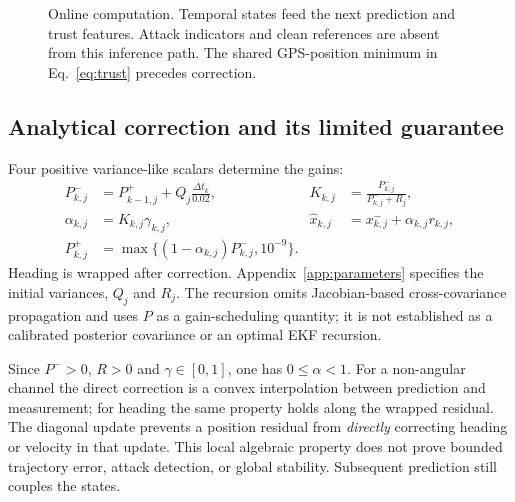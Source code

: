 ﻿\documentclass[10pt,a4paper]{article}
\begin{document}
\begin{figure}[htbp]
\centering
{}
\caption{Online computation. Temporal states feed the next prediction and trust features.
Attack indicators and clean references are absent from this inference path.
The shared GPS-position minimum in Eq.~\eqref{eq:trust} precedes correction.}
\label{fig:architecture}
\end{figure}

\subsection{Analytical correction and its limited guarantee}
Four positive variance-like scalars determine the gains:
\begin{align}
 P_{k,j}^-&=P_{k-1,j}^++Q_j\frac{\Delta t_k}{0.02},&
 K_{k,j}&=\frac{P_{k,j}^-}{P_{k,j}^-+R_j},\nonumber\\
 \alpha_{k,j}&=K_{k,j}\gamma_{k,j},&
 \hat x_{k,j}&=x_{k,j}^-+\alpha_{k,j}r_{k,j},\label{eq:update}\\
 P_{k,j}^+&=\max\{(1-\alpha_{k,j})P_{k,j}^-,10^{-9}\}.&&\nonumber
\end{align}
Heading is wrapped after correction. Appendix~\ref{app:parameters} specifies the
initial variances, $Q_j$ and $R_j$.
The recursion omits Jacobian-based cross-covariance propagation and uses $P$ as a
gain-scheduling quantity; it is not established as a calibrated posterior covariance
or an optimal EKF recursion.

Since $P^->0$, $R>0$ and $\gamma\in[0,1]$, one has $0\leq\alpha<1$.
For a non-angular channel the direct correction is a convex interpolation between
prediction and measurement; for heading the same property holds along the wrapped residual.
The diagonal update prevents a position residual from \emph{directly} correcting
heading or velocity in that update.
This local algebraic property does not prove bounded trajectory error, attack detection,
or global stability. Subsequent prediction still couples the states.
\end{document}
